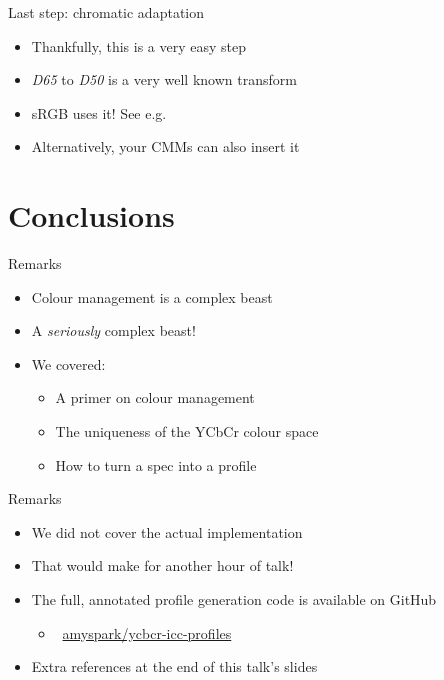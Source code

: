 \documentclass[final, aspectratio=169]{divoc}
\begin{document}
\begin{frame}{Last step: chromatic adaptation}
  \begin{itemize}
    \item Thankfully, this is a very easy step
    \item \emph{D65} to \emph{D50} is a very well known transform
    \item sRGB uses it! See e.g. \textcite{photosauce3}
    \item Alternatively, your CMMs can also insert it 
  \end{itemize}
\end{frame}
\section{Conclusions}
\begin{frame}{Remarks}
  \begin{itemize}
    \item Colour management is a complex beast
    \item A \emph{seriously} complex beast!
    \item We covered:
          \begin{itemize}
            \item A primer on colour management
            \item The uniqueness of the YCbCr colour space
            \item How to turn a spec into a profile
          \end{itemize}
  \end{itemize}
\end{frame}
\begin{frame}{Remarks}
  \begin{itemize}
    \item We did not cover the actual implementation
    \item That would make for another hour of talk!
    \item The full, annotated profile generation code is available on GitHub
          \begin{itemize}
            \item \faGithub~\href{https://github.com/amyspark/ycbcr-icc-profiles}{amyspark/ycbcr-icc-profiles}
          \end{itemize}
    \item Extra references at the end of this talk's slides
  \end{itemize}
\end{frame}
\end{document}
